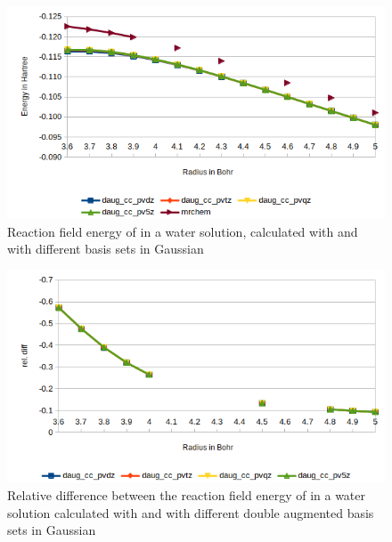 \documentclass[../Thesis.tex]{subfiles}
\begin{document}
\begin{figure}[!htb]
  \centering
    \includegraphics[width=\linewidth]{img/Erdaugcyan.png}
  \caption[Energy plots for ]{Reaction field energy of  in a water solution, calculated with \mrchem
  and with different basis sets in Gaussian}
  \label{fig:cyanEnergyplotsdaug}
\end{figure}

\begin{figure}[!htb]
  \centering
    \includegraphics[width=\linewidth]{img/nopdaugreldiff.png}
    \caption[Relative difference between  and double augmented Gaussian results]{Relative difference between the reaction field energy of  in a water solution calculated with \mrchem
  and with different double augmented basis sets in Gaussian}
  \label{fig:nopreldiffdaug}
\end{figure}
\end{document}
